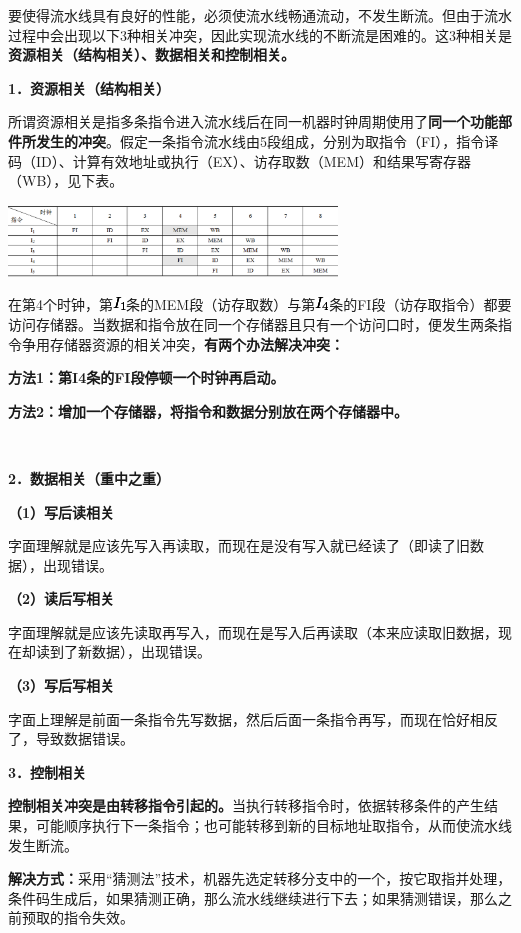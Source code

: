 要使得流水线具有良好的性能，必须使流水线畅通流动，不发生断流。但由于流水过程中会出现以下3种相关冲突，因此实现流水线的不断流是困难的。这3种相关是\textbf{资源相关（结构相关）、数据相关和控制相关。}

{\textbf{1．资源相关（结构相关）}}

所谓资源相关是指多条指令进入流水线后在同一机器时钟周期使用了\textbf{同一个功能部件所发生的冲突}。假定一条指令流水线由5段组成，分别为取指令（FI），指令译码（ID）、计算有效地址或执行（EX）、访存取数（MEM）和结果写寄存器（WB），见下表。

\includegraphics[width=3.43750in,height=0.75000in]{png-jpeg-pics/C656872B483E2D129A4BF3617641FC50.png}

在第4个时钟，第\includegraphics[width=0.13542in,height=0.13542in]{texmath/a7b7ddI1}条的MEM段（访存取数）与第\includegraphics[width=0.14583in,height=0.13542in]{texmath/e32a4cI4}条的FI段（访存取指令）都要访问存储器。当数据和指令放在同一个存储器且只有一个访问口时，便发生两条指令争用存储器资源的相关冲突，\textbf{有两个办法解决冲突：}

{\textbf{方法1：第I4条的FI段停顿一个时钟再启动。}}

{\textbf{方法2：增加一个存储器，将指令和数据分别放在两个存储器中。}}

{\\
}

{{\textbf{2．数据相关（重中之重）}}}

{{\textbf{（1）写后读相关}}}

{字面理解就是应该先写入再读取，而现在是没有写入就已经读了（即{读了旧数据}），出现错误。}

{\textbf{（2）读后写相关}}

{字面理解就是应该先读取再写入，而现在是写入后再读取（{本来应读取旧数据，现在却读到了新数据}），出现错误。}

{\textbf{（3）写后写相关}}

{字面上理解是前面一条指令先写数据，然后后面一条指令再写，而现在恰好相反了，导致数据错误。}

{\textbf{3．控制相关}}

\textbf{控制相关冲突是由转移指令引起的。}当执行转移指令时，依据转移条件的产生结果，可能顺序执行下一条指令；也可能转移到新的目标地址取指令，从而使流水线发生断流。

{\textbf{解决方式：}}采用``猜测法''技术，机器先选定转移分支中的一个，按它取指并处理，条件码生成后，如果猜测正确，那么流水线继续进行下去；如果猜测错误，那么之前预取的指令失效。
